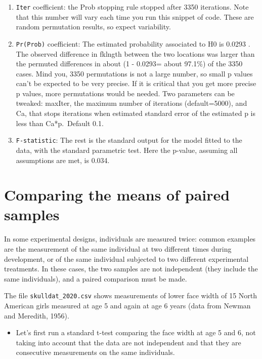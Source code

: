 \documentclass[
  12pt,
]{book}
\providecommand{\tightlist}{%
  \setlength{\itemsep}{0pt}\setlength{\parskip}{0pt}}
\begin{document}
\begin{enumerate}
\def\labelenumi{\arabic{enumi}.}
\tightlist
\item
  \texttt{Iter} coefficient: the Prob stopping rule stopped after 3350 iterations. Note that this number will vary each time you run this snippet of code. These are random permutation results, so expect variability.
\item
  \texttt{Pr(Prob)} coefficient: The estimated probability associated to H0 is 0.0293 . The observed difference in fklngth between the two locations was larger than the permuted differences in about (1 - 0.0293= about 97.1\%) of the 3350 cases. Mind you, 3350 permutations is not a large number, so small p values can't be expected to be very precise. If it is critical that you get more precise p values, more permutations would be needed. Two parameters can be tweaked: maxIter, the maximum number of iterations (default=5000), and Ca, that stops iterations when estimated standard error of the estimated p is less than Ca*p.~Default 0.1.
\item
  \texttt{F-statistic}: The rest is the standard output for the model fitted to the data, with the standard parametric test. Here the p-value, assuming all assumptions are met, is 0.034.
\end{enumerate}

\hypertarget{comparing-the-means-of-paired-samples}{%
\section{Comparing the means of paired samples}\label{comparing-the-means-of-paired-samples}}

In some experimental designs, individuals are measured twice: common examples are the measurement of the same individual at two different times during development, or of the same individual subjected to two different experimental treatments. In these cases, the two samples are not independent (they include the same individuals), and a paired comparison must be made.

The file \texttt{skulldat\_2020.csv} shows measurements of lower face width of 15 North American girls measured at age 5 and again at age 6 years (data from Newman and Meredith, 1956).

\begin{itemize}
\tightlist
\item
  Let's first run a standard t-test comparing the face width at age 5 and 6, not taking into account that the data are not independent and that they are consecutive measurements on the same individuals.
\end{itemize}
\end{document}
